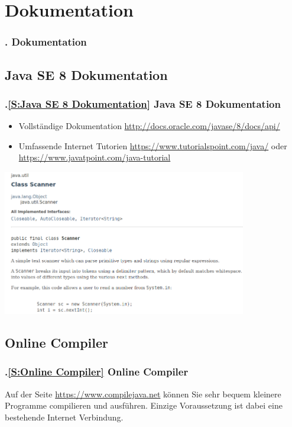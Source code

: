 \AtBeginSection{}
\section{Dokumentation}
\begin{frame}
  \frametitle{\kap. Dokumentation}%
\tableofcontents[current]
\end{frame}


\def\stitle{Java SE 8 Dokumentation}%
\subsection*{\stitle}\label{S:Java SE 8 Dokumentation}
\begin{frame}[t]%
  \frametitle{\kap.\ref{S:Java SE 8 Dokumentation} \stitle}%
\medskip

\begin{itemize}
\item Vollst\"andige Dokumentation \textcolor{KITblue}{\url{http://docs.oracle.com/javase/8/docs/api/}}
\item Umfassende Internet Tutorien \textcolor{KITblue}{\url{https://www.tutorialspoint.com/java/}} oder \textcolor{KITblue}{\url{https://www.javatpoint.com/java-tutorial}}
\end{itemize}
\medskip

\includegraphics[width=0.8\textwidth]{javaDokumentation/java_small.png}
\end{frame}


\def\stitle{Online Compiler}%
\subsection*{\stitle}\label{S:Online Compiler}
\begin{frame}[t]%
  \frametitle{\kap.\ref{S:Online Compiler} \stitle}%
\medskip

Auf der Seite \textcolor{KITblue}{\url{https://www.compilejava.net}} k\"onnen Sie sehr bequem kleinere Programme compilieren und ausf\"uhren.
Einzige Voraussetzung ist dabei eine bestehende Internet Verbindung.
\end{frame}
